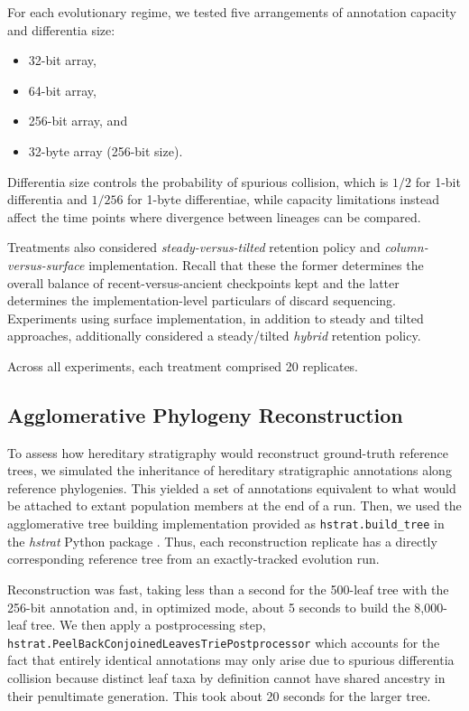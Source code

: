 
For each evolutionary regime, we tested five arrangements of annotation capacity and differentia size:
\begin{itemize}
  \item 32-bit array,
  \item 64-bit array,
  \item 256-bit array, and
  \item 32-byte array (256-bit size).
\end{itemize}

Differentia size controls the probability of spurious collision, which is $1/2$ for 1-bit differentia and $1/256$ for 1-byte differentiae, while capacity limitations instead affect the time points where divergence between lineages can be compared.

Treatments also considered \textit{steady-versus-tilted} retention policy and \textit{column-versus-surface} implementation.
Recall that these the former determines the overall balance of recent-versus-ancient checkpoints kept and the latter determines the implementation-level particulars of discard sequencing.
Experiments using surface implementation, in addition to steady and tilted approaches, additionally considered a steady/tilted \textit{hybrid} retention policy.

Across all experiments, each treatment comprised 20 replicates.

\subsection{Agglomerative Phylogeny Reconstruction}

To assess how hereditary stratigraphy would reconstruct ground-truth reference trees, we simulated the inheritance of hereditary stratigraphic annotations along reference phylogenies.
This yielded a set of annotations equivalent to what would be attached to extant population members at the end of a run.
Then, we used the agglomerative tree building implementation provided as \texttt{hstrat.build\_tree} in the \textit{hstrat} Python package \citep{moreno2022hstrat}.
Thus, each reconstruction replicate has a directly corresponding reference tree from an exactly-tracked evolution run.

Reconstruction was fast, taking less than a second for the 500-leaf tree with the 256-bit annotation and, in optimized mode, about 5 seconds to build the 8,000-leaf tree.
We then apply a postprocessing step, \texttt{hstrat.{\allowbreak}Peel{\allowbreak}Back{\allowbreak}Conjoined{\allowbreak}Leave{\allowbreak}sTrie{\allowbreak}Postprocessor} which accounts for the fact that entirely identical annotations may only arise due to spurious differentia collision because distinct leaf taxa by definition cannot have shared ancestry in their penultimate generation.
This took about 20 seconds for the larger tree.

